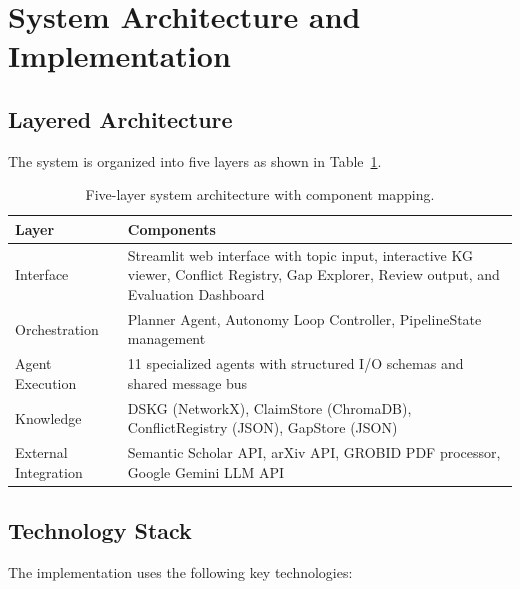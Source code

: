 \section{System Architecture and Implementation}

\subsection{Layered Architecture}

The system is organized into five layers as shown in Table~\ref{tab:layers}.

\begin{table}[ht]
\caption{Five-layer system architecture with component mapping.}\label{tab:layers}
\centering
\small
\begin{tabular}{p{2.8cm}p{8.5cm}}
\toprule
\textbf{Layer} & \textbf{Components} \\
\midrule
Interface & Streamlit web interface with topic input, interactive KG viewer, Conflict Registry, Gap Explorer, Review output, and Evaluation Dashboard \\
Orchestration & Planner Agent, Autonomy Loop Controller, PipelineState management \\
Agent Execution & 11 specialized agents with structured I/O schemas and shared message bus \\
Knowledge & DSKG (NetworkX), ClaimStore (ChromaDB), ConflictRegistry (JSON), GapStore (JSON) \\
External Integration & Semantic Scholar API, arXiv API, GROBID PDF processor, Google Gemini LLM API \\
\bottomrule
\end{tabular}
\end{table}

\subsection{Technology Stack}

The implementation uses the following key technologies:


